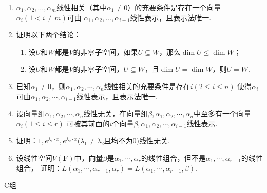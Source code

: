 \begin{enumerate}
    \item $\alpha_1,\alpha_2,\ldots,\alpha_m$线性相关（其中$\alpha_1\neq 0$）的充要条件是存在一个向量$\alpha_i(1<i\neq m)$可由
    $\alpha_1,\alpha_2,\ldots,\alpha_{i-1}$线性表示，且表示法唯一.
    \item 证明以下两个结论：
    \begin{enumerate}[label=(\arabic*)]
        \item 设$U$和$W$都是$V$的非零子空间，如果$U\subseteq W$，那么$\dim U \leqslant \dim W$；
        \item 设$U$和$W$都是$V$的非零子空间，$U\subseteq W$，且$\dim U = \dim W$，则$U = W$.
    \end{enumerate}
    \item 已知$\alpha_1\neq 0$，则$\alpha_1,\alpha_2,\cdots,\alpha_n$线性相关的充要条件是存在$i(2\le i\le n)$
	使得$\alpha_i$可由$\alpha_1,\alpha_2,\cdots,\alpha_{i-1}$线性表示，且表示法唯一.
	\item 设向量组$\alpha_1,\alpha_2,\cdots,\alpha_n$线性无关，在向量组$\beta,\alpha_1,\alpha_2,\cdots,\alpha_n$中至多有一个向量$\alpha_i(1\le i\le r)$
	可被其前面的$i$个向量$\beta,\alpha_1,\alpha_2,\cdots,\alpha_{i-1}$线性表示.
	\item 证明：$1,e^{\lambda_1\cdot x},e^{\lambda_2\cdot  x}(\lambda_1\neq\lambda_2$且均不为0$)$线性无关.
	\item 设线性空间$V(\mathbf{F})$中，向量$\beta$是$\alpha_1,\cdots,\alpha_r$的线性组合，但不是$\alpha_1,\cdots,\alpha_{r-1}$的线性组合，
	证明：$L(\alpha_1,\cdots,\alpha_{r-1},\alpha_r)=L(\alpha_1,\cdots,\alpha_{r-1},\beta)$.
\end{enumerate}
\centerline{\heiti C组}
